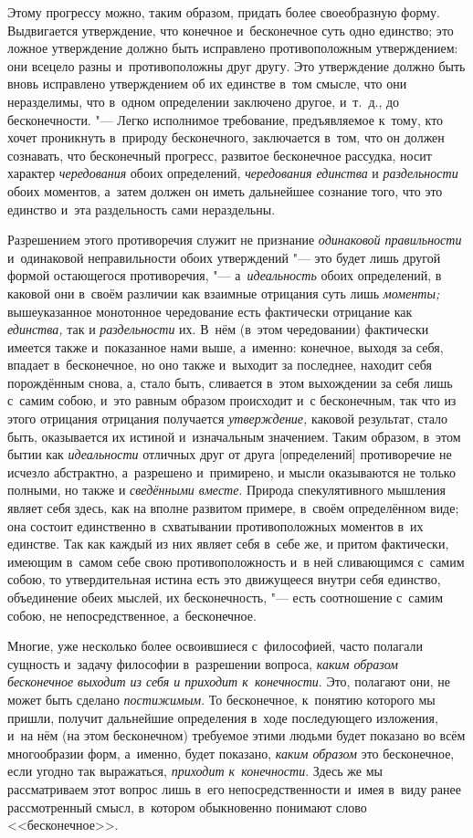 Этому прогрессу можно, таким образом, придать более своеобразную форму.
Выдвигается утверждение, что конечное и~бесконечное суть одно единство; это
ложное утверждение должно быть исправлено противоположным утверждением: они
всецело разны и~противоположны друг другу. Это утверждение должно быть
вновь исправлено утверждением об их единстве в~том смысле, что они
неразделимы, что в~одном определении заключено другое, и~т.~д., до
бесконечности. "--- Легко исполнимое требование, предъявляемое к~тому, кто
хочет проникнуть в~природу бесконечного, заключается в~том, что он должен
сознавать, что бесконечный прогресс, развитое бесконечное рассудка, носит
характер {\em чередования} обоих определений,
{\em чередования единства} и
{\em раздельности} обоих моментов, а~затем должен он
иметь дальнейшее сознание того, что это единство и~эта раздельность сами
нераздельны.

Разрешением этого противоречия служит не признание
{\em одинаковой правильности} и~одинаковой
неправильности обоих утверждений "--- это будет лишь другой формой остающегося
противоречия, "--- а~{\em идеальность} обоих определений,
в каковой они в~своём различии как взаимные отрицания суть лишь
{\em моменты;} вышеуказанное монотонное чередование
есть фактически отрицание как {\em единства,} так и
{\em раздельности} их. В~нём (в~этом чередовании)
фактически имеется также и~показанное нами выше, а~именно: конечное, выходя
за себя, впадает в~бесконечное, но оно также и~выходит за последнее,
находит себя порождённым снова, а, стало быть, сливается в~этом выхождении
за себя лишь с~самим собою, и~это равным образом происходит и~с
бесконечным, так что из этого отрицания отрицания получается
{\em утверждение,} каковой результат, стало быть,
оказывается их истиной и~изначальным значением. Таким образом, в~этом бытии
как {\em идеальности} отличных друг от друга
[определений] противоречие не исчезло абстрактно, а~разрешено и~примирено,
и мысли оказываются не только полными, но также и
{\em сведёнными вместе}. Природа спекулятивного
мышления являет себя здесь, как на вполне развитом примере, в~своём
определённом виде; она состоит единственно в~схватывании противоположных
моментов в~их единстве. Так как каждый из них являет себя в~себе же, и
притом фактически, имеющим в~самом себе свою противоположность и~в ней
сливающимся с~самим собою, то утвердительная истина есть это движущееся
внутри себя единство, объединение обеих мыслей, их бесконечность, "--- есть
соотношение с~самим собою, не непосредственное, а~бесконечное.

Многие, уже несколько более освоившиеся с~философией, часто полагали
сущность и~задачу философии в~разрешении вопроса,
{\em каким образом бесконечное выходит из себя и
приходит к~конечности}. Это, полагают они, не может быть сделано
{\em постижимым}. То бесконечное, к~понятию которого мы
пришли, получит дальнейшие определения в~ходе последующего изложения, и~на
нём (на этом бесконечном) требуемое этими людьми будет показано во всём
многообразии форм, а~именно, будет показано, {\em каким
образом} это бесконечное, если угодно так выражаться,
{\em приходит к~конечности}. Здесь же мы рассматриваем
этот вопрос лишь в~его непосредственности и~имея в~виду ранее рассмотренный
смысл, в~котором обыкновенно понимают слово <<бесконечное>>.


